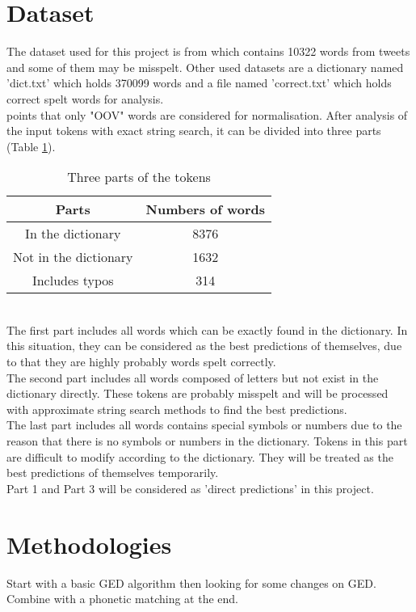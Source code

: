 \documentclass[11pt]{article}
\begin{document}
\section{Dataset}
The dataset used for this project is from  which contains 10322 words from tweets and some of them may be misspelt.
Other used datasets are a dictionary named 'dict.txt' which holds 370099 words and a file named 'correct.txt' which holds correct spelt words for analysis. 
\\  points that only "OOV" words are considered for normalisation. After analysis of the input tokens with exact string search, it can be divided into three parts (Table \ref{table_1}).
\begin{table}[h]
    \begin{center}
        \begin{tabular}{|c|c|}
            \hline
            Parts & Numbers of words \\ \hline
            In the dictionary & 8376 \\ \hline
            Not in the dictionary & 1632 \\ \hline
            Includes typos & 314 \\ \hline
        \end{tabular}
        \caption{Three parts of the tokens}\label{table_1}
    \end{center}
\end{table}
\\The first part includes all words which can be exactly found in the dictionary. In this situation, they can be considered as the best predictions of themselves, due to that they are highly probably words spelt correctly. 
\\The second part includes all words composed of letters but not exist in the dictionary directly. These tokens are probably misspelt and will be processed with approximate string search methods to find the best predictions.
\\The last part includes all words contains special symbols or numbers due to the reason that there is no symbols or numbers in the dictionary. Tokens in this part are difficult to modify according to the dictionary. They will be treated as the best predictions of themselves temporarily.
\\Part 1 and Part 3 will be considered as 'direct predictions' in this project.
\section{Methodologies}
Start with a basic GED algorithm then looking for some changes on GED. Combine with a phonetic matching at the end.
\end{document}
